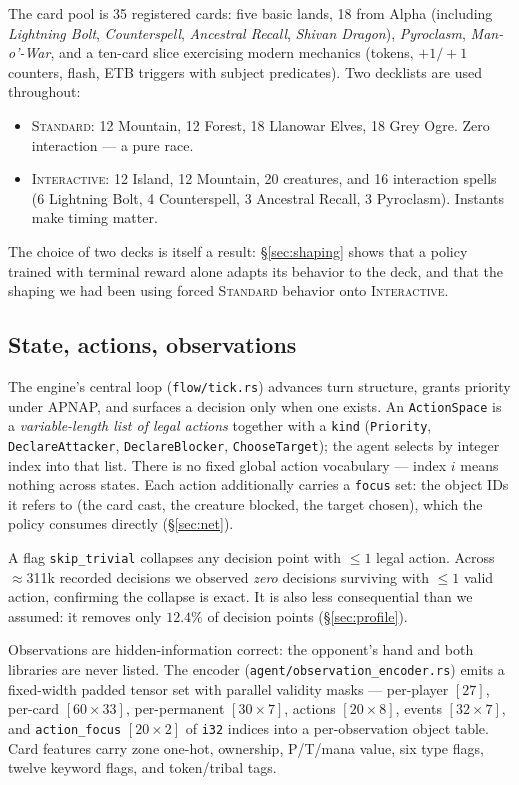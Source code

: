 \documentclass[11pt]{article}
\newcommand{\stddeck}{\textsc{Standard}}
\newcommand{\intdeck}{\textsc{Interactive}}
\begin{document}
The card pool is 35 registered cards: five basic lands, 18 from Alpha (including \textit{Lightning Bolt}, \textit{Counterspell}, \textit{Ancestral Recall}, \textit{Shivan Dragon}), \textit{Pyroclasm}, \textit{Man-o'-War}, and a ten-card slice exercising modern mechanics (tokens, $+1/+1$ counters, flash, ETB triggers with subject predicates). Two decklists are used throughout:

\begin{itemize}\itemsep1pt
\item \stddeck: 12 Mountain, 12 Forest, 18 Llanowar Elves, 18 Grey Ogre. Zero interaction --- a pure race.
\item \intdeck: 12 Island, 12 Mountain, 20 creatures, and 16 interaction spells (6 Lightning Bolt, 4 Counterspell, 3 Ancestral Recall, 3 Pyroclasm). Instants make timing matter.
\end{itemize}

The choice of two decks is itself a result: \S\ref{sec:shaping} shows that a policy trained with terminal reward alone adapts its behavior to the deck, and that the shaping we had been using forced \stddeck{} behavior onto \intdeck.

\subsection{State, actions, observations}

The engine's central loop (\texttt{flow/tick.rs}) advances turn structure, grants priority under APNAP, and surfaces a decision only when one exists. An \texttt{ActionSpace} is a \emph{variable-length list of legal actions} together with a \texttt{kind} (\texttt{Priority}, \texttt{DeclareAttacker}, \texttt{DeclareBlocker}, \texttt{ChooseTarget}); the agent selects by integer index into that list. There is no fixed global action vocabulary --- index $i$ means nothing across states. Each action additionally carries a \texttt{focus} set: the object IDs it refers to (the card cast, the creature blocked, the target chosen), which the policy consumes directly (\S\ref{sec:net}).

A flag \texttt{skip\_trivial} collapses any decision point with $\le 1$ legal action. Across $\approx$311k recorded decisions we observed \emph{zero} decisions surviving with $\le 1$ valid action, confirming the collapse is exact. It is also less consequential than we assumed: it removes only $12.4\%$ of decision points (\S\ref{sec:profile}).

Observations are hidden-information correct: the opponent's hand and both libraries are never listed. The encoder (\texttt{agent/observation\_encoder.rs}) emits a fixed-width padded tensor set with parallel validity masks --- per-player $[27]$, per-card $[60\times33]$, per-permanent $[30\times7]$, actions $[20\times8]$, events $[32\times7]$, and \texttt{action\_focus} $[20\times2]$ of \texttt{i32} indices into a per-observation object table. Card features carry zone one-hot, ownership, P/T/mana value, six type flags, twelve keyword flags, and token/tribal tags.
\end{document}
